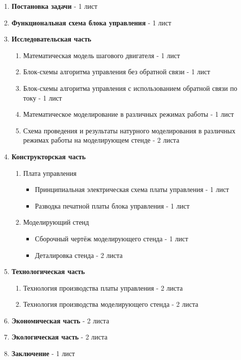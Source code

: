 \begin{enumerate}
    \item \textbf{Постановка задачи} - 1 лист
    \item \textbf{Функциональная схема блока управления} - 1 лист

    \item \textbf{Исследовательская часть}
    \begin{enumerate}
        \item Математическая модель шагового двигателя - 1 лист
        \item Блок-схемы алгоритма управления без обратной связи - 1 лист
        \item Блок-схемы алгоритма управления с использованием обратной связи по току - 1 лист
        \item Математическое моделирование в различных режимах работы - 1 лист
        \item Схема проведения и результаты натурного моделирования в различных режимах работы на моделирующем стенде - 2 листа
    \end{enumerate}

    \item \textbf{Конструкторская часть}
    \begin{enumerate}
        \item Плата управления
        \begin{itemize}
            \item Принципиальная электрическая схема платы управления - 1 лист
            \item Разводка печатной платы блока управления - 1 лист
        \end{itemize}
        \item Моделирующий стенд
        \begin{itemize}
            \item Сборочный чертёж моделирующего стенда - 1 лист
            \item Деталировка стенда - 2 листа
        \end{itemize}
    \end{enumerate}

    \item \textbf{Технологическая часть}
    \begin{enumerate}
        \item Технология производства платы управления - 2 листа
        \item Технология производства моделирующего стенда - 2 листа
    \end{enumerate}

    \item \textbf{Экономическая часть} - 2 листа
    \item \textbf{Экологическая часть} - 2 листа
    \item \textbf{Заключение} - 1 лист
\end{enumerate}

